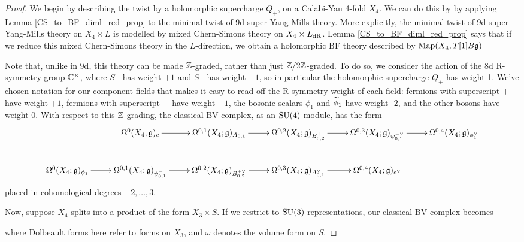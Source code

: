 \documentclass[10pt, oneside]{article}
\begin{document}
\begin{proof}
We begin by describing the twist by a holomorphic supercharge $Q_+$, on a Calabi-Yau 4-fold $X_4$.  We can do this by by applying Lemma \ref{CS_to_BF_diml_red_prop} to the minimal twist of 9d super Yang-Mills theory.  More explicitly, the minimal twist of 9d super Yang-Mills theory on $X_4 \times L$ is modelled by mixed Chern-Simons theory on $X_4 \times L_{\mathrm{dR}}$. Lemma \ref{CS_to_BF_diml_red_prop} says that if we reduce this mixed Chern-Simons theory in the $L$-direction, we obtain a holomorphic BF theory described by $\operatorname{Map}(X_4, T[1]B\mathfrak{g})$

Note that, unlike in 9d, this theory can be made $\mathbb Z$-graded, rather than just $\mathbb Z/2\mathbb Z$-graded.  To do so, we consider the action of the 8d R-symmetry group $\mathbb C^\times$, where $S_+$ has weight $+1$ and $S_-$ has weight $-1$, so in particular the holomorphic supercharge $Q_+$ has weight 1.  We've chosen notation for our component fields that makes it easy to read off the R-symmetry weight of each field: fermions with superscript $+$ have weight $+1$, fermions with superscript $-$ have weight $-1$, the bosonic scalars $\phi_1$ and $\widetilde{\phi}_1$ have weight -$2$, and the other bosons have weight 0.  With respect to this $\mathbb Z$-grading, the classical BV complex, as an $\mathrm{SU}(4)$-module, has the form
\[\xymatrix{&\Omega^0(X_4; \gg)_c \ar[r] &\Omega^{0,1}(X_4; \gg)_{A_{0,1}} \ar[r] &\Omega^{0,2}(X_4; \gg)_{B^+_{0,2}} \ar[r] &\Omega^{0,3}(X_4; \gg)_{\psi_{0,1}^{-\vee}} \ar[r] &\Omega^{0,4}(X_4; \gg)_{\phi_1^\vee} \\
\Omega^0(X_4; \gg)_{\phi_1} \ar[r] &\Omega^{0,1}(X_4; \gg)_{\psi_{0,1}^{-}} \ar[r] &\Omega^{0,2}(X_4; \gg)_{B^{+\vee}_{0,2}} \ar[r] &\Omega^{0,3}(X_4; \gg)_{A_{0,1}^\vee} \ar[r] &\Omega^{0,4}(X_4; \gg)_{c^\vee}&
}\]
placed in cohomological degrees $-2, \ldots, 3$.

Now, suppose $X_4$ splits into a product of the form $X_3 \times S$.  If we restrict to $\mathrm{SU}(3)$ representations, our classical BV complex becomes

where Dolbeault forms here refer to forms on $X_3$, and $\omega$ denotes the volume form on $S$.


\end{proof}
\end{document}

